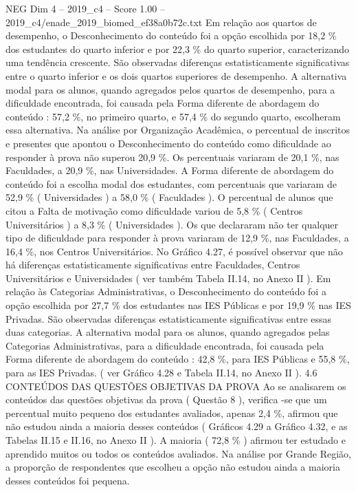 \begin{textsample}{NEG Dim 4 – 2019\_c4 – Score 1.00 – 2019\_c4/enade\_2019\_biomed\_ef38a0b72c.txt}
Em relação aos quartos de desempenho, o Desconhecimento do conteúdo foi a opção escolhida por 18,2 \% dos estudantes do quarto inferior e por 22,3 \% do quarto superior, caracterizando uma tendência crescente.
São observadas diferenças estatisticamente significativas entre o quarto inferior e os dois quartos superiores de desempenho.
A alternativa modal para os alunos, quando agregados pelos quartos de desempenho, para a dificuldade encontrada, foi causada pela Forma diferente de abordagem do conteúdo : 57,2 \%, no primeiro quarto, e 57,4 \% do segundo quarto, escolheram essa alternativa.
Na análise por Organização Acadêmica, o percentual de inscritos e presentes que apontou o Desconhecimento do conteúdo como dificuldade ao responder à prova não superou 20,9 \%.
Os percentuais variaram de 20,1 \%, nas Faculdades, a 20,9 \%, nas Universidades.
A Forma diferente de abordagem do conteúdo foi a escolha modal dos estudantes, com percentuais que variaram de 52,9 \% ( Universidades ) a 58,0 \% ( Faculdades ).
O percentual de alunos que citou a Falta de motivação como dificuldade variou de 5,8 \% ( Centros Universitários ) a 8,3 \% ( Universidades ).
Os que declararam não ter qualquer tipo de dificuldade para responder à prova variaram de 12,9 \%, nas Faculdades, a 16,4 \%, nos Centros Universitários.
No Gráfico 4.27, é possível observar que não há diferenças estatisticamente significativas entre Faculdades, Centros Universitários e Universidades ( ver também Tabela II.14, no Anexo II ).
Em relação às Categorias Administrativas, o Desconhecimento do conteúdo foi a opção escolhida por 27,7 \% dos estudantes nas IES Públicas e por 19,9 \% nas IES Privadas.
São observadas diferenças estatisticamente significativas entre essas duas categorias.
A alternativa modal para os alunos, quando agregados pelas Categorias Administrativas, para a dificuldade encontrada, foi causada pela Forma diferente de abordagem do conteúdo : 42,8 \%, para IES Públicas e 55,8 \%, para as IES Privadas. ( ver Gráfico 4.28 e Tabela II.14, no Anexo II ). 4.6 CONTEÚDOS DAS QUESTÕES OBJETIVAS DA PROVA Ao se analisarem os conteúdos das questões objetivas da prova ( Questão 8 ), verifica -se que um percentual muito pequeno dos estudantes avaliados, apenas 2,4 \%, afirmou que não estudou ainda a maioria desses conteúdos ( Gráficos 4.29 a Gráfico 4.32, e as Tabelas II.15 e II.16, no Anexo II ).
A maioria ( 72,8 \% ) afirmou ter estudado e aprendido muitos ou todos os conteúdos avaliados.
Na análise por Grande Região, a proporção de respondentes que escolheu a opção não estudou ainda a maioria desses conteúdos foi pequena.

\end{textsample}
